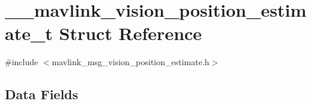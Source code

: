 \hypertarget{struct____mavlink__vision__position__estimate__t}{\section{\+\_\+\+\_\+mavlink\+\_\+vision\+\_\+position\+\_\+estimate\+\_\+t Struct Reference}
\label{struct____mavlink__vision__position__estimate__t}
}


{\ttfamily \#include $<$mavlink\+\_\+msg\+\_\+vision\+\_\+position\+\_\+estimate.\+h$>$}

\subsection*{Data Fields}

